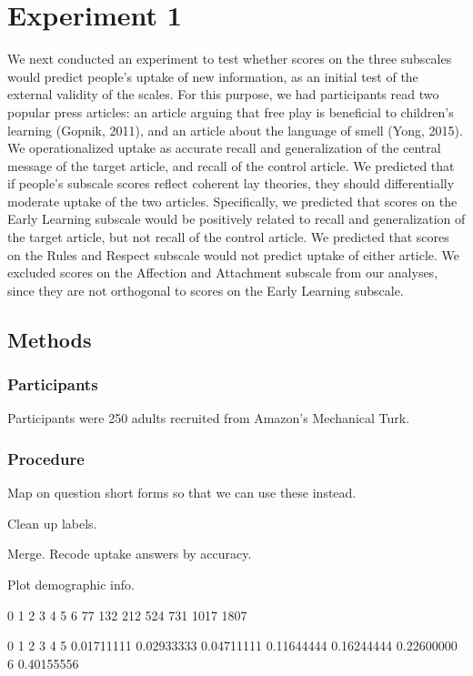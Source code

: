 \documentclass[10pt, letterpaper]{article}
\newenvironment{CodeChunk}{}{}
\begin{document}
\section{Experiment 1}\label{experiment-1}

We next conducted an experiment to test whether scores on the three
subscales would predict people's uptake of new information, as an
initial test of the external validity of the scales. For this purpose,
we had participants read two popular press articles: an article arguing
that free play is beneficial to children's learning (Gopnik, 2011), and
an article about the language of smell (Yong, 2015). We operationalized
uptake as accurate recall and generalization of the central message of
the target article, and recall of the control article. We predicted that
if people's subscale scores reflect coherent lay theories, they should
differentially moderate uptake of the two articles. Specifically, we
predicted that scores on the Early Learning subscale would be positively
related to recall and generalization of the target article, but not
recall of the control article. We predicted that scores on the Rules and
Respect subscale would not predict uptake of either article. We excluded
scores on the Affection and Attachment subscale from our analyses, since
they are not orthogonal to scores on the Early Learning subscale.

\subsection{Methods}\label{methods}

\subsubsection{Participants}\label{participants}

Participants were 250 adults recruited from Amazon's Mechanical Turk.

\subsubsection{Procedure}\label{procedure}

Map on question short forms so that we can use these instead.

Clean up labels.

Merge. Recode uptake answers by accuracy.

Plot demographic info.

\begin{CodeChunk}
\begin{CodeOutput}

   0    1    2    3    4    5    6 
  77  132  212  524  731 1017 1807 
\end{CodeOutput}
\begin{CodeOutput}

         0          1          2          3          4          5 
0.01711111 0.02933333 0.04711111 0.11644444 0.16244444 0.22600000 
         6 
0.40155556 
\end{CodeOutput}
\end{CodeChunk}
\end{document}
